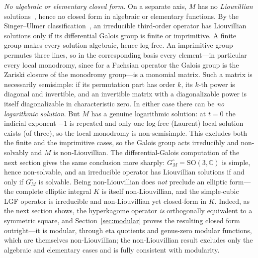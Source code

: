 \documentclass[cntp]{ipart}
\theoremstyle{plain}
\theoremstyle{remark}
\begin{document}
\emph{No algebraic or elementary closed form.} On a separate axis, $M$ has no
\emph{Liouvillian} solutions~\cite{vdPutSinger}, hence no closed form in algebraic or elementary functions. By the
Singer--Ulmer classification~\cite{SingerUlmer}, an irreducible third-order operator has Liouvillian solutions only
if its differential Galois group is finite or imprimitive. A finite group makes every solution algebraic, hence log-free. An imprimitive group
permutes three lines, so in the corresponding basis every element---in particular every local monodromy, since for
a Fuchsian operator the Galois group is the Zariski closure of the monodromy group---is a monomial matrix. Such a
matrix is necessarily semisimple: if its permutation part has order $k$, its $k$-th power is diagonal and
invertible, and an invertible matrix with a diagonalizable power is itself diagonalizable in characteristic zero.
In either case there can be \emph{no logarithmic solution}. But $M$ has a genuine logarithmic solution:
at $t=0$ the indicial exponent $-1$ is repeated and only one log-free (Laurent) local solution exists (of three),
so the local monodromy is non-semisimple. This excludes both the finite and the imprimitive cases, so the Galois
group acts irreducibly and non-solvably and $M$ is non-Liouvillian. The differential-Galois computation of the next
section gives the same conclusion more sharply: $G_M^\circ=\mathrm{SO}(3,\mathbb{C})$ is simple, hence non-solvable,
and an irreducible operator has Liouvillian solutions if and only if $G_M^\circ$ is solvable. Being non-Liouvillian
does \emph{not} preclude an elliptic form---the complete elliptic integral $K$ is itself non-Liouvillian, and the
simple-cubic LGF operator is irreducible and non-Liouvillian yet closed-form in $K$. Indeed, as the next section
shows, the hyperkagome operator \emph{is} orthogonally equivalent to a symmetric square, and Section~\ref{sec:modular}
proves the resulting closed form outright---it is modular, through eta quotients and genus-zero modular
functions, which are themselves non-Liouvillian; the non-Liouvillian result excludes only the algebraic and elementary cases and is
fully consistent with modularity.
\end{document}
